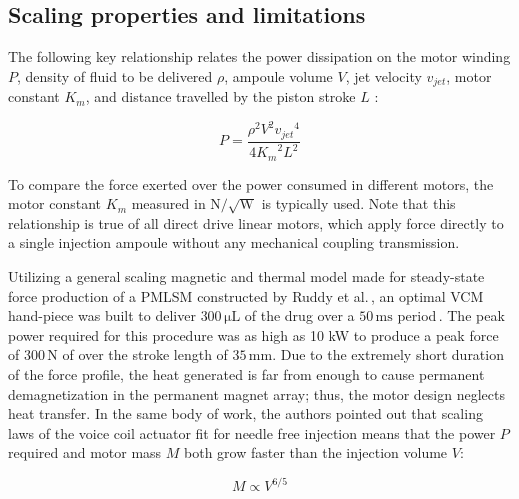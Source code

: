     
    \subsection{Scaling properties and limitations} \label{Chapter:background/voice coil motors for NFJI/scaling and limitation}
    
    
    The following key relationship relates the power dissipation on the motor winding $P$, density of fluid to be delivered $\rho$, ampoule volume $V$, jet velocity $v_{jet}$, motor constant $K_m$, and distance travelled by the piston stroke $L$ \cite{Williams2012}:
    
    
    \begin{equation}
        P=\frac{\rho^2 V^2 {v_{jet}}^4}{4 {K_m}^2 L^2}
        \label{eq:power required for F,V,v_jet,K_m, and L}
    \end{equation}
    
    
    To compare the force exerted over the power consumed in different motors, the motor constant $K_m$ measured in $\mathrm{N/\sqrt{W}}$  is typically used. Note that this relationship is true of all direct drive linear motors, which apply force directly to a single injection ampoule without any mechanical coupling transmission.
    
    
    Utilizing a general scaling magnetic and thermal model made for steady-state force production of a \ac{PMLSM} constructed by Ruddy et al.\,\cite{Ruddy2011DesignMotors}, an optimal \acs{VCM} hand-piece was built to deliver $\mathrm{300\,\mu L}$ of the drug over a $\mathrm{50\,ms}$ period\,\cite{taberner2006}. The peak power required for this procedure was as high as 10 kW to produce a peak force of $\mathrm{300\,N}$ of over the stroke length of $\mathrm{35\,mm}$. Due to the extremely short duration of the force profile, the heat generated is far from enough to cause permanent demagnetization in the permanent magnet array; thus, the motor design neglects heat transfer. In the same body of work, the authors pointed out that scaling laws of the voice coil actuator fit for needle free injection means that the power $P$ required and motor mass $M$ both grow faster than the injection volume $V$:
    
    
    \begin{equation}
        M \propto V^{6/5}
        \label{eq:scaling property of VCM}
    \end{equation}


